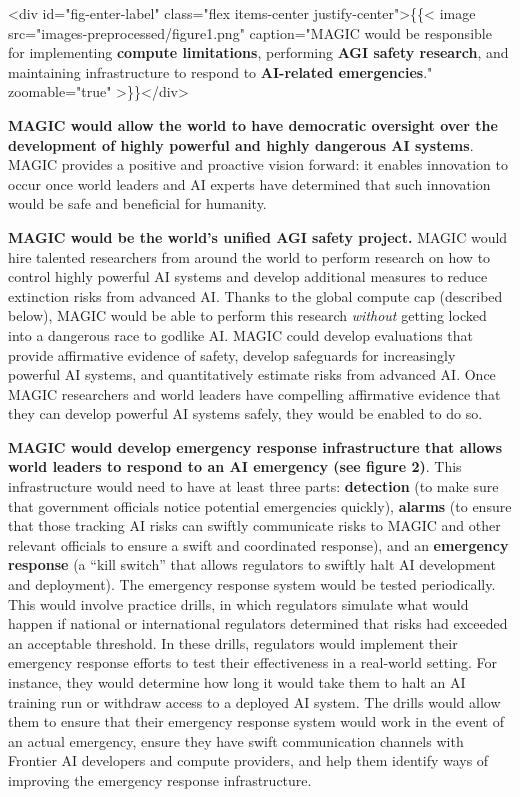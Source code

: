 \documentclass[12pt,a4paper]{article}
\begin{document}
<div id="fig-enter-label" class="flex items-center justify-center">\{\{< image src="images-preprocessed/figure1.png" caption="MAGIC would be responsible for implementing \textbf{compute limitations}, performing \textbf{AGI safety research}, and maintaining infrastructure to respond to \textbf{AI-related emergencies}." zoomable="true" >\}\}</div>



\textbf{MAGIC would allow the world to have democratic oversight over the development of highly powerful and highly dangerous AI systems}. MAGIC provides a positive and proactive vision forward: it enables innovation to occur once world leaders and AI experts have determined that such innovation would be safe and beneficial for humanity. 

\textbf{MAGIC would be the world’s unified AGI safety project. }MAGIC would hire talented researchers from around the world to perform research on how to control highly powerful AI systems and develop additional measures to reduce extinction risks from advanced AI. Thanks to the global compute cap (described below), MAGIC would be able to perform this research \textit{without} getting locked into a dangerous race to godlike AI. MAGIC could develop evaluations that provide affirmative evidence of safety, develop safeguards for increasingly powerful AI systems, and quantitatively estimate risks from advanced AI. Once MAGIC researchers and world leaders have compelling affirmative evidence that they can develop powerful AI systems safely, they would be enabled to do so.

\textbf{MAGIC would develop emergency response infrastructure that allows world leaders to respond to an AI emergency (see figure 2)}. This infrastructure would need to have at least three parts: \textbf{detection} (to make sure that government officials notice potential emergencies quickly), \textbf{alarms} (to ensure that those tracking AI risks can swiftly communicate risks to MAGIC and other relevant officials to ensure a swift and coordinated response), and an \textbf{emergency response} (a “kill switch” that allows regulators to swiftly halt AI development and deployment). 
The emergency response system would be tested periodically. This would involve practice drills, in which regulators simulate what would happen if national or international regulators determined that risks had exceeded an acceptable threshold. In these drills, regulators would implement their emergency response efforts to test their effectiveness in a real-world setting. For instance, they would determine how long it would take them to halt an AI training run or withdraw access to a deployed AI system. The drills would allow them to ensure that their emergency response system would work in the event of an actual emergency, ensure they have swift communication channels with Frontier AI developers and compute providers, and help them identify ways of improving the emergency response infrastructure. 
\end{document}
